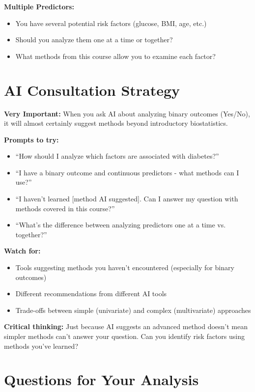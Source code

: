 \documentclass[11pt]{article}
\begin{document}
\noindent\textbf{Multiple Predictors:}
\begin{itemize}
\item You have several potential risk factors (glucose, BMI, age, etc.)
\item Should you analyze them one at a time or together?
\item What methods from this course allow you to examine each factor?
\end{itemize}

\section*{AI Consultation Strategy}

\begin{tcolorbox}[colback=aiblue!10,colframe=aiblue,boxrule=1pt,arc=2pt]
\textbf{Very Important:} When you ask AI about analyzing binary outcomes (Yes/No), it will almost certainly suggest methods beyond introductory biostatistics.

\textbf{Prompts to try:}
\begin{itemize}
\item ``How should I analyze which factors are associated with diabetes?''
\item ``I have a binary outcome and continuous predictors - what methods can I use?''
\item ``I haven't learned [method AI suggested]. Can I answer my question with methods covered in this course?''
\item ``What's the difference between analyzing predictors one at a time vs. together?''
\end{itemize}

\textbf{Watch for:}
\begin{itemize}
\item Tools suggesting methods you haven't encountered (especially for binary outcomes)
\item Different recommendations from different AI tools
\item Trade-offs between simple (univariate) and complex (multivariate) approaches
\end{itemize}

\textbf{Critical thinking:} Just because AI suggests an advanced method doesn't mean simpler methods can't answer your question. Can you identify risk factors using methods you've learned?
\end{tcolorbox}

\section*{Questions for Your Analysis}
\end{document}
